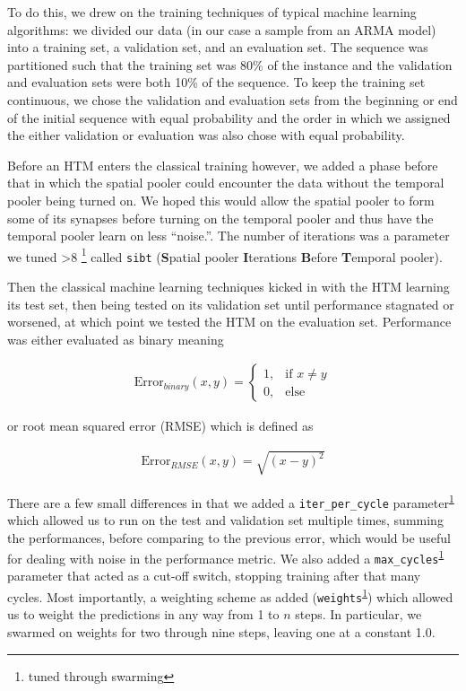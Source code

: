\documentclass[oneside,12pt,openany]{book}
\newcounter{savefootnote}
\newcounter{symfootnote}
\newcommand{\astfootnote}[1]{%
    \setcounter{savefootnote}{\value{footnote}}%
    \setcounter{footnote}{\value{symfootnote}}%
    \ifnum\value{footnote}>8\setcounter{footnote}{0}\fi%
    \let\oldthefootnote=\thefootnote%
    \renewcommand{\thefootnote}{\fnsymbol{footnote}}%
    \footnote{#1}%
    \let\thefootnote=\oldthefootnote%
    \setcounter{symfootnote}{\value{footnote}}%
    \setcounter{footnote}{\value{savefootnote}}%
}
\begin{document}
	To do this, we drew on the training techniques of typical machine learning algorithms: we divided our data (in our case a sample from an ARMA model) into a training set, a validation set, and an evaluation set. The sequence was partitioned such that the training set was 80\% of the instance and the validation and evaluation sets were both 10\% of the sequence. To keep the training set continuous, we chose the validation and evaluation sets from the beginning or end of the initial sequence with equal probability and the order in which we assigned the either validation or evaluation was also chose with equal probability.
    
    Before an HTM enters the classical training however, we added a phase before that in which the spatial pooler could encounter the data without the temporal pooler being turned on. We hoped this would allow the spatial pooler to form some of its synapses before turning on the temporal pooler and thus have the temporal pooler learn on less ``noise.''. The number of iterations was a parameter we tuned\astfootnote{tuned through swarming\label{footnote:swarm}} called \texttt{sibt} (\textbf{S}patial pooler \textbf{I}terations \textbf{B}efore \textbf{T}emporal pooler).
	
	Then the classical machine learning techniques kicked in with the HTM learning its test set, then being tested on its validation set until performance stagnated or worsened, at which point we tested the HTM on the evaluation set. Performance was either evaluated as binary meaning
    
    \begin{align}
        \text{Error}_{binary}(x,y) = 
        \begin{cases}
        1, & \text{if }x\neq y \\
        0, &\text{else}
        \end{cases}
    \end{align}
    
    or root mean squared error (RMSE) which is defined as
    
    \begin{align}
        \text{Error}_{RMSE}(x,y) = \sqrt{(x-y)^{2}}
    \end{align}
    
     There are a few small differences in that we added a \texttt{iter\_per\_cycle} parameter\textsuperscript{\ref{footnote:swarm}} which allowed us to run on the test and validation set multiple times, summing the performances, before comparing to the previous error, which would be useful for dealing with noise in the performance metric. We also added a \texttt{max\_cycles}\textsuperscript{\ref{footnote:swarm}} parameter that acted as a cut-off switch, stopping training after that many cycles. Most importantly, a weighting scheme as added (\texttt{weights}\textsuperscript{\ref{footnote:swarm}}) which allowed us to weight the predictions in any way from 1 to $n$ steps. In particular, we swarmed on weights for two through nine steps, leaving one at a constant 1.0.
	
\end{document}
